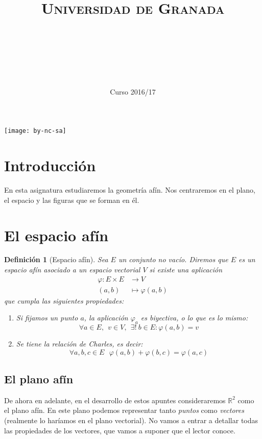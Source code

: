 \documentclass[11pt, a4paper]{article}
\title{
  \normalfont \normalsize
  \textsc{Universidad de Granada} \\ [25pt]    %
  \horrule{0.5pt} \\[0.4cm] %
  \huge \sffamily\subject\\ %
  \horrule{2pt} \\[0.5cm] %
}
\author{\Large\sffamily{\docauthor}}
\date{\vspace{-1.5em} \normalsize \sffamily Curso 2016/17}
\newif\IfInSansMode
\newcommand{\R}{\mathbb{R}}
\theoremstyle{theorem-style}
\theoremstyle{definition-style}
\newtheorem{ndef}{Definición}[section]
\theoremstyle{remark-style}
\theoremstyle{example-style}
\newenvironment{nlist}
{\begin{enumerate}
    \renewcommand\labelenumi{(\emph{\roman{enumi})}}}
  {\end{enumerate}}
\begin{document}

\newpage
\hfill
\newpage

\tableofcontents    %
\vfill
\begin{center}
  \texttt{[image: by-nc-sa]}  %
\end{center}
\newpage


\section*{Introducción}
En esta asignatura estudiaremos la geometría afín. Nos centraremos en el plano, el espacio y las figuras que se forman en él.
\newpage

\section{El espacio afín}
\begin{ndef}[Espacio afín]
  Sea $E$ un conjunto no vacío. Diremos que $E$ es un \textit{espacio afín} asociado a un espacio vectorial $V$ si existe una aplicación
  \begin{align*}
    \varphi: E \times E & \rightarrow V \\
    (a,b) & \mapsto \varphi(a,b)
  \end{align*}
  que cumpla las siguientes propiedades:
  \begin{nlist}
  \item Si fijamos un punto $a$, la aplicación $\varphi_a$ es biyectiva, o lo que es lo mismo:
    $$\forall a \in E, \ \ v \in V, \ \ \exists! \ b \in E:\varphi(a,b)=v$$
  \item Se tiene la relación de Charles, es decir:
    $$\forall a, b, c \in E \ \ \  \varphi(a,b) + \varphi(b,c) = \varphi(a,c)$$
  \end{nlist}
\end{ndef}
\subsection{El plano afín}

De ahora en adelante, en el desarrollo de estos apuntes consideraremos $\R^2$ como el plano afín. En este plano podemos representar tanto \textit{puntos} como \textit{vectores} (realmente lo haríamos en el plano vectorial). No vamos a entrar a detallar todas las propiedades de los vectores, que vamos a suponer que el lector conoce. \\
\end{document}
